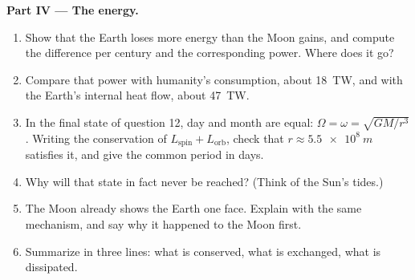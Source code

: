 \begin{problem}
\medskip
\noindent\textbf{Part IV --- The energy.}
\begin{enumerate}[resume]
  \item Show that the Earth loses more energy than the Moon gains, and
        compute the difference per century and the corresponding power.
        Where does it go?
  \item Compare that power with humanity's consumption, about
        \qty{18}{TW}, and with the Earth's internal heat flow, about
        \qty{47}{TW}.
  \item In the final state of question 12, day and month are equal:
        $\Omega = \omega = \sqrt{GM/r^3}$. Writing the conservation of
        $L_{\text{spin}} + L_{\text{orb}}$, check that $r \approx
        \qty{5.5e8}{m}$ satisfies it, and give the common period in days.
  \item Why will that state in fact never be reached? (Think of the Sun's
        tides.)
  \item The Moon already shows the Earth one face. Explain with the same
        mechanism, and say why it happened to the Moon first.
  \item Summarize in three lines: what is conserved, what is exchanged,
        what is dissipated.
\end{enumerate}
\end{problem}

